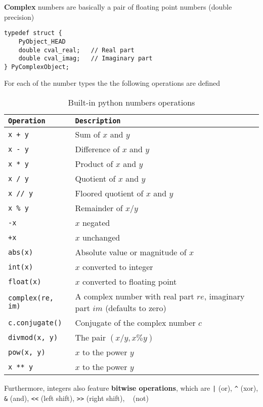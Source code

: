 \documentclass[10pt, openany]{article}
\begin{document}
  \textbf{Complex} numbers are basically a pair of floating point 
  numbers (double precision)
  \begin{lstlisting}
typedef struct {
    PyObject_HEAD
    double cval_real;   // Real part
    double cval_imag;   // Imaginary part
} PyComplexObject;
  \end{lstlisting}
  For each of the number types the the following operations 
  are defined
  \begin{table}[ht]
    \centering
    \caption{Built-in python numbers operations}
    \begin{tabular}{@{}ll@{}}
        \toprule
        \texttt{Operation} & \texttt{Description} \\ 
        \midrule
        \texttt{x + y} & Sum of \(x\) and \(y\) \\
        \texttt{x - y} & Difference of \(x\) and \(y\) \\
        \texttt{x * y} & Product of \(x\) and \(y\) \\
        \texttt{x / y} & Quotient of \(x\) and \(y\) \\
        \texttt{x // y} & Floored quotient of \(x\) and \(y\) \\
        \texttt{x \% y} & Remainder of \(x / y\) \\
        \texttt{-x} & \(x\) negated \\
        \texttt{+x} & \(x\) unchanged \\
        \texttt{abs(x)} & Absolute value or magnitude of \(x\) \\
        \texttt{int(x)} & \(x\) converted to integer \\
        \texttt{float(x)} & \(x\) converted to floating point \\
        \texttt{complex(re, im)} & A complex number with real 
          part \(re\), imaginary part 
          \(im\) (defaults to zero) \\
        \texttt{c.conjugate()} & Conjugate of 
          the complex number \(c\) \\
        \texttt{divmod(x, y)} & The pair \((x / y, x \% y)\) \\
        \texttt{pow(x, y)} & \(x\) to the power \(y\) \\
        \texttt{x ** y} & \(x\) to the power \(y\) \\ 
        \bottomrule
    \end{tabular}
    \label{tab:math_operations}
  \end{table}
  Furthermore, integers also feature \textbf{bitwise operations}, 
  which are \texttt{|} (or), \texttt{\^} (xor), 
  \texttt{\&} (and), 
  \texttt{<<} (left shift), \texttt{>>} (right shift), 
  \texttt{~} (not) \par
\end{document}
